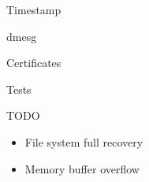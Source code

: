 \documentclass[14pt]{beamer}
\begin{document}
\begin{frame}{Timestamp}
\end{frame}

\begin{frame}{dmesg}
\end{frame}

\begin{frame}{Certificates}
\end{frame}

\begin{frame}{Tests}
\end{frame}

\begin{frame}{TODO}
\begin{itemize}
    \item File system full recovery
    \item Memory buffer overflow
\end{itemize}
\end{frame}
\end{document}
